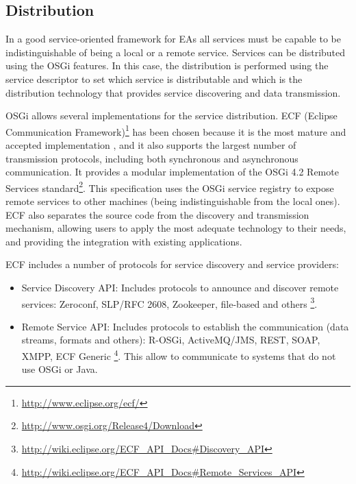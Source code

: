 
\subsection{Distribution}
In a good service-oriented framework for EAs all services must be capable to be indistinguishable of being a local or a remote service. Services can be distributed using the OSGi features. In this case, the distribution is performed using the service descriptor to set which service is distributable and which is the distribution technology that provides service discovering and data transmission.

OSGi allows several implementations for the service distribution. ECF (Eclipse Communication Framework)\footnote{\url{http://www.eclipse.org/ecf/}} has been chosen because it is the most mature and accepted implementation \cite{petzold2011dynamic}, and it also supports the largest number of transmission protocols, including both synchronous and asynchronous communication. It provides a modular implementation of the OSGi 4.2 Remote Services standard\footnote{\url{http://www.osgi.org/Release4/Download}}. This specification uses the OSGi service registry to expose remote services to other machines (being indistinguishable from the local ones). ECF also separates the source code from the discovery and transmission mechanism, allowing users to apply the most adequate technology to their needs, and providing the integration with existing applications. %

ECF includes a number of protocols for service discovery and service providers:
\begin{itemize}
\item Service Discovery API: Includes protocols to announce and discover remote services: Zeroconf, SLP/RFC 2608, Zookeeper, file-based and others \footnote{\url{http://wiki.eclipse.org/ECF_API_Docs\#Discovery_API}}.
\item Remote Service API: Includes protocols to establish the communication (data streams, formats and others): R-OSGi, ActiveMQ/JMS, REST, SOAP, XMPP, ECF Generic \footnote{\url{http://wiki.eclipse.org/ECF_API_Docs\#Remote_Services_API}}. This allow to communicate to systems that do not use OSGi or Java.
\end{itemize}